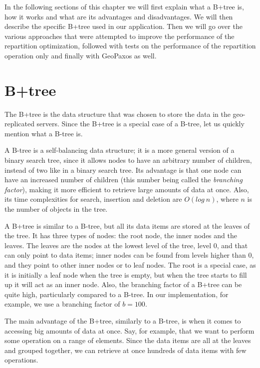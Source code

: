 In the following sections of this chapter we will first explain what a B+tree is, how it works and what are its advantages and disadvantages. We will then describe the specific B+tree used in our application. Then we will go over the various approaches that were attempted to improve the performance of the repartition optimization, followed with tests on the performance of the repartition operation only and finally with GeoPaxos as well.

\section{B+tree}\label{sec:B+tree}
The B+tree is the data structure that was chosen to store the data in the geo-replicated servers. Since the B+tree is a special case of a B-tree\citep{b-tree}, let us quickly mention what a B-tree\citep{b-tree} is.

A B-tree is a self-balancing data structure; it is a more general version of a binary search tree, since it allows nodes to have an arbitrary number of children, instead of two like in a binary search tree. Its advantage is that one node can have an increased number of children (this number being called the \emph{branching factor}), making it more efficient to retrieve large amounts of data at once. Also, its time complexities for search, insertion and deletion are $O(log\ n)$, where $n$ is the number of objects in the tree.

A B+tree is similar to a B-tree, but all its data items are stored at the leaves of the tree. It has three types of nodes: the root node, the inner nodes and the leaves. The leaves are the nodes at the lowest level of the tree, level 0, and that can only point to data items; inner nodes can be found from levels higher than 0, and they point to other inner nodes or to leaf nodes. The root is a special case, as it is initially a leaf node when the tree is empty, but when the tree starts to fill up it will act as an inner node. Also, the branching factor of a B+tree can be quite high, particularly compared to a B-tree. In our implementation, for example, we use a branching factor of $b=100$.

The main advantage of the B+tree, similarly to a B-tree, is when it comes to accessing big amounts of data at once. Say, for example, that we want to perform some operation on a range of elements. Since the data items are all at the leaves and grouped together, we can retrieve at once hundreds of data items with few operations.

